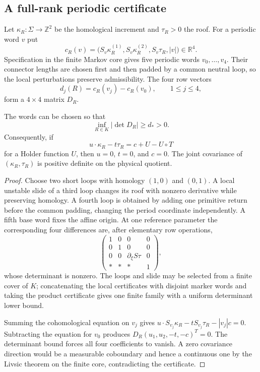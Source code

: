 \subsection{A full-rank periodic certificate}

Let $\kappa_R:\Sigma\to\mathbb Z^2$ be the homological increment and
$\tau_R>0$ the roof.  For a periodic word $v$ put
\[
 c_R(v)=\bigl(S_v\kappa_R^{(1)},S_v\kappa_R^{(2)},
              S_v\tau_R,|v|\bigr)\in\mathbb R^4.
\]
Specification in the finite Markov core gives five periodic words
$v_0,\ldots,v_4$.  Their connector lengths are chosen first and then padded by
a common neutral loop, so the local perturbations preserve admissibility.  The
four row vectors
\[
 d_j(R)=c_R(v_j)-c_R(v_0),\qquad1\le j\le4,
\]
form a $4\times4$ matrix $D_R$.

\begin{lemma}
\label{lem:r7-a2-fiveword}
The words can be chosen so that
\[
 \inf_{R\in K}|\det D_R|\ge d_*>0.
\]
Consequently, if
\[
 u\cdot\kappa_R-t\tau_R=c+U-U\circ T
\]
for a Holder function $U$, then $u=0$, $t=0$, and $c=0$.  The joint covariance
of $(\kappa_R,\tau_R)$ is positive definite on the physical quotient.
\end{lemma}

\begin{proof}
Choose two short loops with homology $(1,0)$ and $(0,1)$.  A local unstable
slide of a third loop changes its roof with nonzero derivative while preserving
homology.  A fourth loop is obtained by adding one primitive return before the
common padding, changing the period coordinate independently.  A fifth base
word fixes the affine origin.  At one reference parameter the corresponding
four differences are, after elementary row operations,
\[
 \begin{pmatrix}
 1&0&0&0\\
 0&1&0&0\\
 0&0&\partial_\xi S\tau&0\\
 *&*&*&1
 \end{pmatrix},
\]
whose determinant is nonzero.  The loops and slide may be selected from a
finite cover of $K$; concatenating the local certificates with disjoint marker
words and taking the product certificate gives one finite family with a
uniform determinant lower bound.

Summing the cohomological equation on $v_j$ gives
$u\cdot S_{v_j}\kappa_R-tS_{v_j}\tau_R-|v_j|c=0$.
Subtracting the equation for $v_0$ produces $D_R(u_1,u_2,-t,-c)^T=0$.
The determinant bound forces all four coefficients to vanish.  A zero
covariance direction would be a measurable coboundary and hence a continuous
one by the Livsic theorem on the finite core, contradicting the certificate.
\end{proof}

